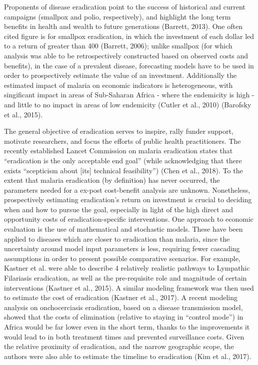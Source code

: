 \documentclass[]{article}
\begin{document}
Proponents of disease eradication point to the success of historical and
current campaigns (smallpox and polio, respectively), and highlight the
long term benefits in health and wealth to future generations (Barrett,
2013). One often cited figure is for smallpox eradication, in which the
investment of each dollar led to a return of greater than 400 (Barrett,
2006); unlike smallpox (for which analysis was able to be
retrospectively constructed based on observed costs and benefits), in
the case of a prevalent disease, forecasting models have to be used in
order to prospectively estimate the value of an investment. Additionally
the estimated impact of malaria on economic indicators is heterogeneous,
with singificant impact in areas of Sub-Saharan Africa - where the
endemicity is high - and little to no impact in areas of low endemicity
(Cutler et al., 2010) (Barofsky et al., 2015).

The general objective of eradication serves to inspire, rally funder
support, motivate researchers, and focus the efforts of public health
practitioners. The recently established Lancet Commission on malaria
eradication states that ``eradication is the only acceptable end goal''
(while acknowledging that there exists ``scepticism about {[}its{]}
technical feasibility'') (Chen et al., 2018). To the extent that malaria
eradication (by definition) has never occurred, the parameters needed
for a ex-post cost-benefit analysis are unknown. Nonetheless,
prospectively estimating eradication's return on investment is crucial
to deciding when and how to pursue the goal, especially in light of the
high direct and opportunity costs of eradication-specific interventions.
One approach to economic evaluation is the use of mathematical and
stochastic models. These have been applied to diseases which are closer
to eradication than malaria, since the uncertainty around model input
parameters is less, requiring fewer cascading assumptions in order to
present possible comparative scenarios. For example, Kastner et al. were
able to describe 4 relatively realistic pathways to Lympathic Filariasis
eradication, as well as the pre-requisite role and magnitude of certain
interventions (Kastner et al., 2015). A similar modeling framework was
then used to estimate the cost of eradication (Kastner et al., 2017). A
recent modeling analysis on onchocerciasis eradication, based on a
disease transmission model, showed that the costs of elimination
(relative to staying in ``control mode'') in Africa would be far lower
even in the short term, thanks to the improvements it would lead to in
both treatment times and prevented surveillance costs. Given the
relative proximity of eradication, and the narrow geographic scope, the
authors were also able to estimate the timeline to eradication (Kim et
al., 2017).
\end{document}
